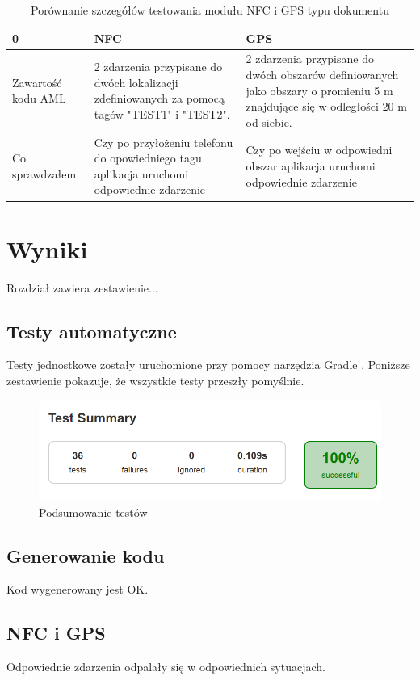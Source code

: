 \documentclass	{xmgr}
\begin{document}
\begin{table}[!tbh]
	\begin{tabular}{|l|l|l|} \hline
		0 & NFC & GPS \\ \hline
		Zawartość kodu AML & 2 zdarzenia przypisane do dwóch lokalizacji zdefiniowanych za pomocą tagów "TEST1" i "TEST2". & 2 zdarzenia przypisane do dwóch obszarów definiowanych jako obszary o promieniu 5 m znajdujące się w odległości 20 m od siebie. \\ \hline
		Co sprawdzałem  & Czy po przyłożeniu telefonu do opowiedniego tagu aplikacja uruchomi odpowiednie zdarzenie & Czy po wejściu w odpowiedni obszar aplikacja uruchomi odpowiednie zdarzenie \\ \hline
	\end{tabular}
	\caption{Porównanie szczegółów testowania modułu NFC i GPS
		typu dokumentu}
\end{table}

\section{Wyniki}
Rozdział zawiera zestawienie...

\subsection{Testy automatyczne}
Testy jednostkowe zostały uruchomione przy pomocy narzędzia Gradle \cite{Gradle:2017:Doc}. Poniższe zestawienie pokazuje, że wszystkie testy przeszły pomyślnie.

\begin{figure}[!tbh]
	\centering
	\includegraphics[width=1.0\hsize]{fig/test_summary}
	\caption{Podsumowanie testów}
\end{figure}

\subsection{Generowanie kodu}
Kod wygenerowany jest OK.

\subsection{NFC i GPS}
Odpowiednie zdarzenia odpalały się w odpowiednich sytuacjach.
\end{document}
